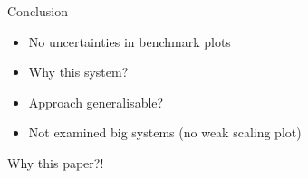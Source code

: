 \documentclass{beamer}
\begin{document}
\begin{frame}{Conclusion}
\begin{itemize} \pause
    \item No uncertainties in benchmark plots \pause
    \item Why this system? \pause
    \item Approach generalisable? \pause
    \item Not examined big systems (no weak scaling plot) \pause
\end{itemize}
\begin{highlightbox}
    Why this paper?!
\end{highlightbox}
\end{frame}
\end{document}
